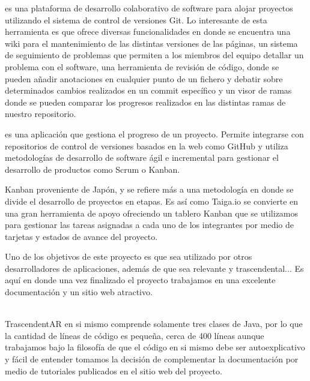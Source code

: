 \begin{multicols}{2}
 es una plataforma de desarrollo colaborativo de software para alojar proyectos utilizando el sistema de control de versiones Git. Lo interesante de esta herramienta es que ofrece diversas funcionalidades en donde se encuentra una wiki para el mantenimiento de las distintas versiones de las páginas, un sistema de seguimiento de problemas que permiten a los miembros del equipo detallar un problema con el software, una herramienta de revisión de código, donde se pueden añadir anotaciones en cualquier punto de un fichero y debatir sobre determinados cambios realizados en un commit específico y un visor de ramas donde se pueden comparar los progresos realizados en las distintas ramas de nuestro repositorio. \cite{github}



 es una aplicación que gestiona el progreso de un proyecto. Permite integrarse con repositorios de control de versiones basados en la web como GitHub y utiliza metodologías de desarrollo de software ágil e incremental para gestionar el desarrollo de productos como Scrum o Kanban. 

Kanban proveniente de Japón, y se refiere más a una metodología en donde se divide el desarrollo de proyectos en etapas. Es así como Taiga.io se convierte en una gran herramienta de apoyo ofreciendo un tablero Kanban que se utilizamos para gestionar las tareas asignadas a cada uno de los integrantes por medio de tarjetas y estados de avance del proyecto. 


Uno de los objetivos de este proyecto es que sea utilizado por otros desarrolladores de aplicaciones, además de que sea relevante y trascendental... Es aquí en donde una vez finalizado el proyecto trabajamos en una excelente documentación y un sitio web atractivo. 



\\
TrascendentAR en si mismo comprende solamente tres clases de Java, por lo que la cantidad de líneas de código es pequeña, cerca de 400 líneas aunque trabajamos bajo la filosofía de que el código en si mismo debe ser autoexplicativo y fácil de entender tomamos la decisión de complementar la documentación por medio de tutoriales publicados en el sitio web del proyecto.


\end{multicols}
